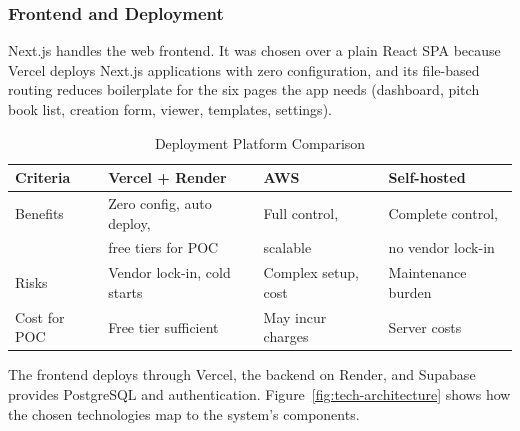 \subsubsection{Frontend and Deployment}

Next.js handles the web frontend. It was chosen over a plain React SPA because Vercel deploys Next.js applications with zero configuration, and its file-based routing reduces boilerplate for the six pages the app needs (dashboard, pitch book list, creation form, viewer, templates, settings).

\begin{table}[H]
\centering
\begin{tabular}{|l|l|l|l|}
\hline
\rowcolor{gray!20} \textbf{Criteria} & \textbf{Vercel + Render} & \textbf{AWS} & \textbf{Self-hosted} \\
\hline
Benefits & Zero config, auto deploy, & Full control, & Complete control, \\
 & free tiers for POC & scalable & no vendor lock-in \\
\hline
Risks & Vendor lock-in, cold starts & Complex setup, cost & Maintenance burden \\
\hline
Cost for POC & Free tier sufficient & May incur charges & Server costs \\
\hline
\end{tabular}
\caption{Deployment Platform Comparison}
\label{tab:deploy}
\end{table}

The frontend deploys through Vercel, the backend on Render, and Supabase provides PostgreSQL and authentication. Figure~\ref{fig:tech-architecture} shows how the chosen technologies map to the system's components.


